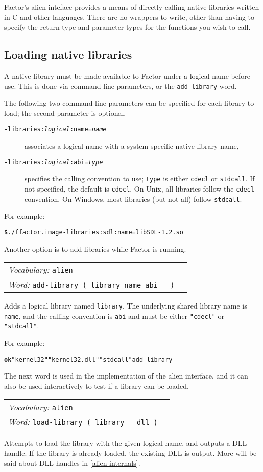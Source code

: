 \documentclass{book}
\newcommand{\vocabulary}[1]{\emph{Vocabulary:} \texttt{#1}&\\}
\newcommand{\ordinaryword}[2]{\index{\texttt{#1}}\emph{Word:} \texttt{#2}&\\}
\newcommand{\wordtable}[1]{


\begin{tabularx}{12cm}{lX}
\hline
#1
\hline
\end{tabularx}

}
\begin{document}
Factor's alien inteface provides a means of directly calling native libraries written in C and other languages. There are no
wrappers to write, other than having to specify the return type and parameter types for
the functions you wish to call.

\subsection{Loading native libraries}

A native library must be made available to Factor under a logical name before use. This is done via command line parameters, or the \verb|add-library| word.

The following two command line parameters can be specified for each library to load; the second parameter is optional.
\begin{description}
\item[\texttt{-libraries:\emph{logical}:name=\emph{name}}] associates a logical name with a system-specific native library name,
\item[\texttt{-libraries:\emph{logical}:abi=\emph{type}}] specifies the calling convention to use; \verb|type| is either \verb|cdecl| or \verb|stdcall|. If not specified, the default is \verb|cdecl|. On Unix, all libraries follow the \verb|cdecl| convention. On Windows, most libraries (but not all) follow \verb|stdcall|.
\end{description}

For example:
\begin{alltt}
\textbf{\$} ./f factor.image -libraries:sdl:name=libSDL-1.2.so
\end{alltt}

Another option is to add libraries while Factor is running.
\wordtable{
\vocabulary{alien}
\ordinaryword{add-library}{add-library ( library name abi -- )}
}
Adds a logical library named \verb|library|. The underlying shared library name is \verb|name|, and the calling convention is \verb|abi| and must be either \verb|"cdecl"| or \verb|"stdcall"|.

For example:
\begin{alltt}
\textbf{ok} "kernel32" "kernel32.dll"  "stdcall"  add-library
\end{alltt}
The next word is used in the implementation of the alien interface, and it can also be used
interactively to test if a library can be loaded.

\wordtable{
\vocabulary{alien}
\ordinaryword{load-library}{load-library ( library -- dll )}
}
Attempts to load the library with the given logical name, and outputs a DLL handle. If the library is already loaded, the existing DLL is output.
More will be said about DLL handles in \ref{alien-internals}.
\end{document}
